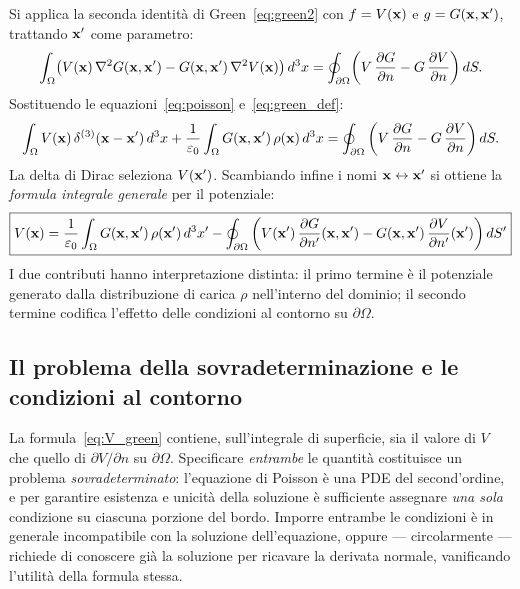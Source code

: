 Si applica la seconda identità di Green~\eqref{eq:green2} con $f = V(\mathbf{x})$ e
$g = G(\mathbf{x}, \mathbf{x}')$, trattando $\mathbf{x}'$ come parametro:
\begin{equation}
    \int_\Omega \!\left( V(\mathbf{x})\, \nabla^2 G(\mathbf{x},\mathbf{x}') - G(\mathbf{x},\mathbf{x}')\,
    \nabla^2 V(\mathbf{x}) \right) d^3x
    = \oint_{\partial\Omega} \!\left( V \, \frac{\partial G}{\partial n}
    - G \, \frac{\partial V}{\partial n} \right) dS.
\end{equation}
Sostituendo le equazioni~\eqref{eq:poisson} e~\eqref{eq:green_def}:
\begin{equation}
    \int_\Omega V(\mathbf{x})\, \delta^{(3)}(\mathbf{x}-\mathbf{x}')\, d^3x
    + \frac{1}{\varepsilon_0}\int_\Omega G(\mathbf{x},\mathbf{x}')\, \rho(\mathbf{x})\, d^3x
    = \oint_{\partial\Omega} \left( V \, \frac{\partial G}{\partial n}
    - G \, \frac{\partial V}{\partial n} \right) dS.
\end{equation}
La delta di Dirac seleziona $V(\mathbf{x}')$. Scambiando infine i nomi
$\mathbf{x} \leftrightarrow \mathbf{x}'$ si ottiene la \emph{formula integrale generale}
per il potenziale:
\begin{equation}\label{eq:V_green}
    \boxed{
    V(\mathbf{x}) = \frac{1}{\varepsilon_0}\int_\Omega G(\mathbf{x},\mathbf{x}')\,\rho(\mathbf{x}')\,d^3x'
    - \oint_{\partial\Omega} \left( V(\mathbf{x}')\, \frac{\partial G}{\partial n'}(\mathbf{x},\mathbf{x}')
    - G(\mathbf{x},\mathbf{x}')\, \frac{\partial V}{\partial n'}(\mathbf{x}') \right) dS'
    }
\end{equation}
I due contributi hanno interpretazione distinta: il primo termine è il potenziale
generato dalla distribuzione di carica $\rho$ nell'interno del dominio; il secondo
termine codifica l'effetto delle condizioni al contorno su $\partial\Omega$.

\subsection{Il problema della sovradeterminazione e le condizioni al contorno}

La formula~\eqref{eq:V_green} contiene, sull'integrale di superficie, sia il valore
di $V$ che quello di $\partial V / \partial n$ su $\partial\Omega$.
Specificare \emph{entrambe} le quantità costituisce un problema \emph{sovradeterminato}:
l'equazione di Poisson è una PDE del second'ordine, e per garantire esistenza e
unicità della soluzione è sufficiente assegnare \emph{una sola} condizione su
ciascuna porzione del bordo.
Imporre entrambe le condizioni è in generale incompatibile con la soluzione
dell'equazione, oppure — circolarmente — richiede di conoscere già la soluzione per
ricavare la derivata normale, vanificando l'utilità della formula stessa.

